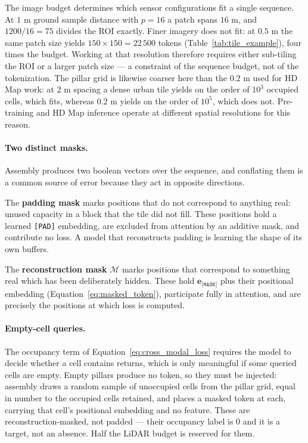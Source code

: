 \documentclass{book}
\begin{document}
The image budget determines which sensor configurations fit a
single sequence.  At $1$ m ground sample distance with $p = 16$ a
patch spans $16$ m, and $1200 / 16 = 75$ divides the ROI exactly.
Finer imagery does not fit: at $0.5$ m the same patch size yields
$150 \times 150 = 22\,500$ tokens
(Table~\ref{tab:tile_example}), four times the budget.  Working
at that resolution therefore requires either sub-tiling the ROI
or a larger patch size --- a constraint of the sequence budget,
not of the tokenization.  The pillar grid is likewise coarser
here than the $0.2$ m used for HD Map work: at $2$ m spacing a
dense urban tile yields on the order of $10^3$ occupied cells,
which fits, whereas $0.2$ m yields on the order of $10^5$, which
does not.  Pre-training and HD Map inference operate at different
spatial resolutions for this reason.

\paragraph{Two distinct masks.}

Assembly produces two boolean vectors over the sequence, and
conflating them is a common source of error because they act in
opposite directions.

The \textbf{padding mask} marks positions that do not correspond
to anything real: unused capacity in a block that the tile did
not fill.  These positions hold a learned \texttt{[PAD]}
embedding, are excluded from attention by an additive mask, and
contribute no loss.  A model that reconstructs padding is
learning the shape of its own buffers.

The \textbf{reconstruction mask} $\mathcal{M}$ marks positions
that correspond to something real which has been deliberately
hidden.  These hold $\mathbf{e}_{\texttt{[MASK]}}$ plus their
positional embedding
(Equation~\eqref{eq:masked_token}), participate fully in
attention, and are precisely the positions at which loss is
computed.

\paragraph{Empty-cell queries.}

The occupancy term of Equation~\eqref{eq:cross_modal_loss}
requires the model to decide whether a cell contains returns,
which is only meaningful if some queried cells are empty.  Empty
pillars produce no token, so they must be injected: assembly
draws a random sample of unoccupied cells from the pillar grid,
equal in number to the occupied cells retained, and places a
masked token at each, carrying that cell's positional embedding
and no feature.  These are reconstruction-masked, not padded ---
their occupancy label is $0$ and it is a target, not an absence.
Half the LiDAR budget is reserved for them.
\end{document}
